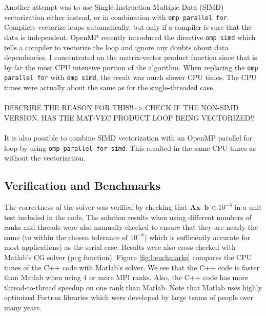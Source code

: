 \documentclass{article}
\begin{document}
Another attempt was to use Single Instruction Multiple Data (SIMD) vectorization either instead, or in combination with \texttt{omp parallel for}. Compilers vectorize loops automatically, but only if a compiler is sure that the data is independent. OpenMP recently introduced the directive \texttt{omp simd} which tells a compiler to vectorize the loop and ignore any doubts about data dependencies. I concentrated on the matrix-vector product function since that is by far the most CPU intensive portion of the algorithm. When replacing the \texttt{omp parallel for} with \texttt{omp simd}, the result was much slower CPU times. The CPU times were actually about the same as for the single-threaded case. \\\\


DESCRIBE THE REASON FOR THIS!!-->  CHECK IF THE NON-SIMD VERSION, HAS THE MAT-VEC PRODUCT LOOP BEING VECTORIZED!!\\\\

It is also possible to combine SIMD vectorization with an OpenMP parallel for loop by using \texttt{omp parallel for simd}. This resulted in the same CPU times as without the vectorization.

\subsection{Verification and Benchmarks}
The correctness of the solver was verified by checking that $\mathbf{Ax} – \mathbf{b} < 10^{-8}$ in a unit test included in the code. The solution results when using different numbers of ranks and threads were also manually checked to ensure that they are nearly the same (to within the chosen tolerance of $10^{-8}$) which is sufficiently accurate for most applications) as the serial case. Results were also cross-checked with Matlab’s CG solver (pcg function). Figure \ref{fig:benchmarks} compares the CPU times of the C++ code with Matlab’s solver. We see that the C++ code is faster than Matlab when using 4 or more MPI ranks. Also, the C++ code has more thread-to-thread speedup on one rank than Matlab. Note that Matlab uses highly optimized Fortran libraries which were developed by large teams of people over many years.
\end{document}
